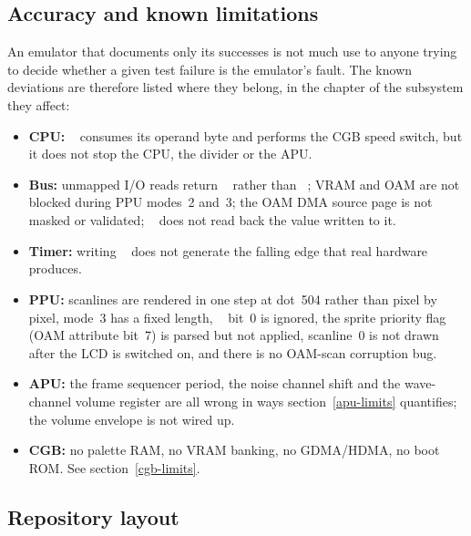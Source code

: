 \documentclass[twoside,a4paper]{refart}
\DeclareRobustCommand\fname[1]{%
  \texttt{\edef\gbemudetok{\detokenize{#1}}%
         \expandafter\seqsplit\expandafter{\gbemudetok}}}
\begin{document}
\subsection{Accuracy and known limitations}
\label{limits-intro}

An emulator that documents only its successes is not much use to anyone
trying to decide whether a given test failure is the emulator's fault.
The known deviations are therefore listed where they belong, in the
chapter of the subsystem they affect:

\begin{itemize}
\item \textbf{CPU:} \fname{STOP} consumes its operand byte and performs the
      CGB speed switch, but it does not stop the CPU, the divider or the
      APU.
\item \textbf{Bus:} unmapped I/O reads return \fname{0x00} rather than
      \fname{0xFF}; VRAM and OAM are not blocked during PPU modes~2 and~3;
      the OAM DMA source page is not masked or validated; \fname{0xFF46}
      does not read back the value written to it.
\item \textbf{Timer:} writing \fname{TAC} does not generate the
      falling edge that real hardware produces.
\item \textbf{PPU:} scanlines are rendered in one step at dot~504 rather
      than pixel by pixel, mode~3 has a fixed length, \fname{LCDC} bit~0 is
      ignored, the sprite priority flag (OAM attribute bit~7) is parsed
      but not applied, scanline~0 is not drawn after the LCD is switched
      on, and there is no OAM-scan corruption bug.
\item \textbf{APU:} the frame sequencer period, the noise channel shift
      and the wave-channel volume register are all wrong in ways
      section~\ref{apu-limits} quantifies; the volume envelope is not
      wired up.
\item \textbf{CGB:} no palette RAM, no VRAM banking, no GDMA/HDMA, no
      boot ROM.  See section~\ref{cgb-limits}.
\end{itemize}

\subsection{Repository layout}
\label{repo-layout}
\end{document}
